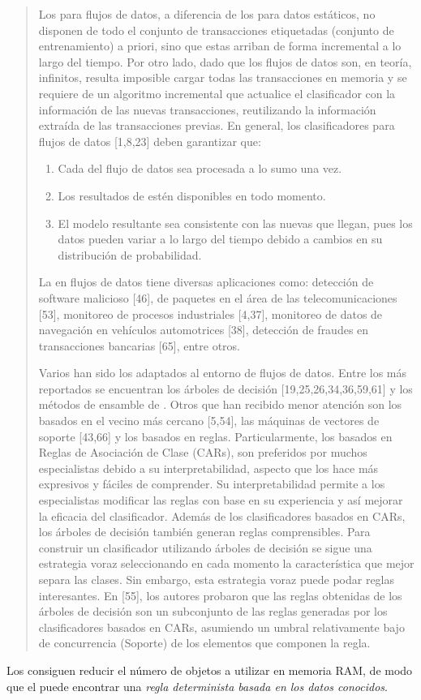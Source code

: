 \begin{quote}
Los \clasificadores para flujos de datos, a diferencia de los \clasificadores para datos estáticos, no disponen de todo el conjunto de transacciones etiquetadas (conjunto de entrenamiento) a priori, sino que estas arriban de forma incremental a lo largo del tiempo. Por otro lado, dado que los flujos de datos son, en teoría, infinitos, resulta imposible cargar todas las transacciones en memoria y se requiere de un algoritmo incremental que actualice el clasificador con la información de las nuevas transacciones, reutilizando la información extraída de las transacciones previas. En general, los clasificadores para flujos de datos [1,8,23] deben garantizar que:

\begin{enumerate}
  \item Cada \transaccion del flujo de datos sea procesada a lo sumo una vez.
  \item Los resultados de \clasificacion estén disponibles en todo momento.
  \item El modelo resultante sea consistente con las nuevas \transacciones que llegan, pues los datos pueden variar a lo largo del tiempo debido a cambios en su distribución de probabilidad.
\end{enumerate}

La \clasificacion en flujos de datos tiene diversas aplicaciones como: detección de software malicioso [46], \clasificacion de paquetes en el área de las telecomunicaciones [53], monitoreo de procesos industriales [4,37], monitoreo de datos de navegación en vehículos automotrices [38], detección de fraudes en transacciones bancarias [65], entre otros.

Varios han sido los \clasificadores adaptados al entorno de flujos de datos. Entre los más reportados se encuentran los árboles de decisión [19,25,26,34,36,59,61] y los métodos de ensamble de \clasificadores [9,39,47,51,57]. Otros \clasificadores que han recibido menor atención son los basados en el vecino más cercano [5,54], las máquinas de vectores de soporte [43,66] y los basados en reglas. Particularmente, los \clasificadores basados en Reglas de Asociación de Clase (CARs), son preferidos por muchos especialistas debido a su interpretabilidad, aspecto que los hace más expresivos y fáciles de comprender. Su interpretabilidad permite a los especialistas modificar las reglas con base en su experiencia y así mejorar la eficacia del clasificador. Además de los clasificadores basados en CARs, los árboles de decisión también generan reglas comprensibles. Para construir un clasificador utilizando árboles de decisión se sigue una estrategia voraz seleccionando en cada momento la característica que mejor separa las clases. Sin embargo, esta estrategia voraz puede podar reglas interesantes. En [55], los autores probaron que las reglas obtenidas de los árboles de decisión son un subconjunto de las reglas generadas por los clasificadores basados en CARs, asumiendo un umbral relativamente bajo de concurrencia (Soporte) de los elementos que componen la regla.
\end{quote}

Los \catalogos consiguen reducir el número de objetos a utilizar en memoria RAM, de modo que el \clasificador puede encontrar una \emph{regla determinista basada en los datos conocidos}.
